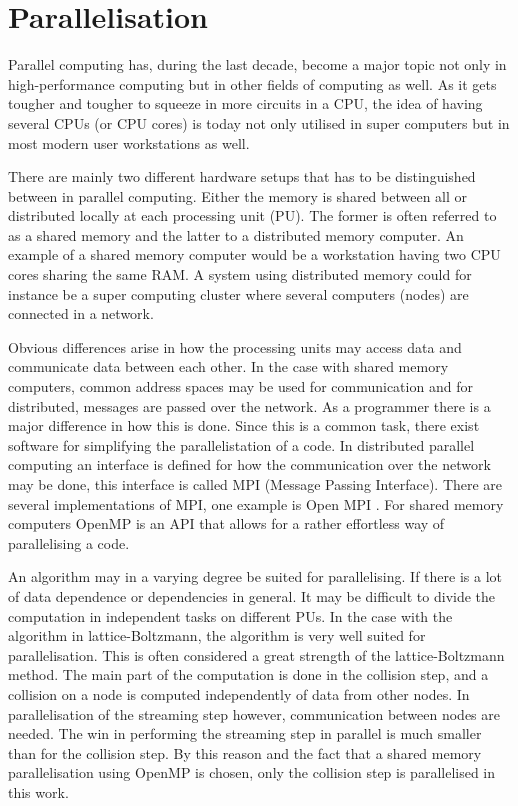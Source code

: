 \section{Parallelisation}

Parallel computing has, during the last decade, become a major topic
not only in high-performance computing but in other fields of
computing as well. As it gets tougher and tougher to squeeze in more
circuits in a CPU, the idea of having several CPUs (or CPU cores) is
today not only utilised in super computers but in most modern user
workstations as well.

There are mainly two different hardware setups that has to be
distinguished between in parallel computing. Either the memory is
shared between all or distributed locally at each processing unit
(PU). The former is often referred to as a shared memory and the
latter to a distributed memory computer. An example of a shared memory
computer would be a workstation having two CPU cores sharing the same
RAM. A system using distributed memory could for instance be a super
computing cluster where several computers (nodes) are connected in a
network.

Obvious differences arise in how the processing units may access data
and communicate data between each other.  In the case with shared
memory computers, common address spaces may be used for communication
and for distributed, messages are passed over the network. As a
programmer there is a major difference in how this is done. Since this
is a common task, there exist software for simplifying the
parallelistation of a code. In distributed parallel computing an
interface is defined for how the communication over the network may be
done, this interface is called MPI (Message Passing Interface). There
are several implementations of MPI, one example is Open MPI
\cite{openmpi}. For shared memory computers OpenMP \cite{openmp} is an
API that allows for a rather effortless way of parallelising a code.

An algorithm may in a varying degree be suited for parallelising. If
there is a lot of data dependence or dependencies in general. It may
be difficult to divide the computation in independent tasks on
different PUs. In the case with the algorithm in lattice-Boltzmann,
the algorithm is very well suited for parallelisation. This is often
considered a great strength of the lattice-Boltzmann method. The
main part of the computation is done in the collision step, and a
collision on a node is computed independently of data from other
nodes. In parallelisation of the streaming step however, communication
between nodes are needed. The win in performing the streaming step in
parallel is much smaller than for the collision step. By this reason
and the fact that a shared memory parallelisation using OpenMP is
chosen, only the collision step is parallelised in this work.

